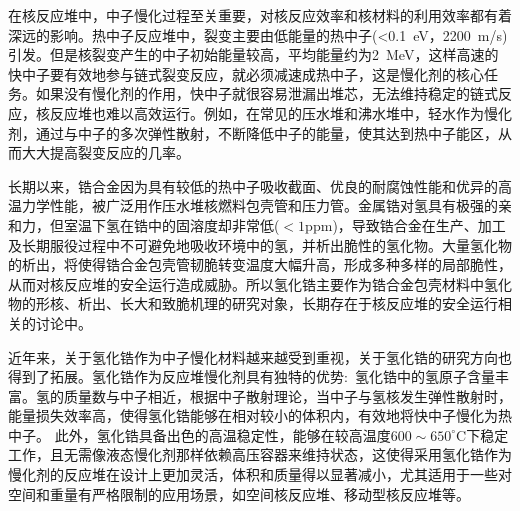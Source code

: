 \maketitle
在核反应堆中，中子慢化过程至关重要，对核反应效率和核材料的利用效率都有着深远的影响。热中子反应堆中，裂变主要由低能量的热中子\textrm{(<0.1~eV，2200~m/s)}引发。但是核裂变产生的中子初始能量较高，平均能量约为\textrm{2~MeV}，这样高速的快中子要有效地参与链式裂变反应，就必须减速成热中子，这是慢化剂的核心任务。如果没有慢化剂的作用，快中子就很容易泄漏出堆芯，无法维持稳定的链式反应，核反应堆也难以高效运行。例如，在常见的压水堆和沸水堆中，轻水作为慢化剂，通过与中子的多次弹性散射，不断降低中子的能量，使其达到热中子能区，从而大大提高裂变反应的几率。

长期以来，锆合金因为具有较低的热中子吸收截面、优良的耐腐蚀性能和优异的高温力学性能，被广泛用作压水堆核燃料包壳管和压力管。金属锆对氢具有极强的亲和力，但室温下氢在锆中的固溶度却非常低\textrm{($<1\mathrm{ppm}$)}，导致锆合金在生产、加工及长期服役过程中不可避免地吸收环境中的氢，并析出脆性的氢化物。大量氢化物的析出，将使得锆合金包壳管韧脆转变温度大幅升高，形成多种多样的局部脆性，从而对核反应堆的安全运行造成威胁。所以氢化锆主要作为锆合金包壳材料中氢化物的形核、析出、长大和致脆机理的研究对象，长期存在于核反应堆的安全运行相关的讨论中。

近年来，关于氢化锆作为中子慢化材料越来越受到重视，关于氢化锆的研究方向也得到了拓展。氢化锆作为反应堆慢化剂具有独特的优势:~氢化锆中的氢原子含量丰富。氢的质量数与中子相近，根据中子散射理论，当中子与氢核发生弹性散射时，能量损失效率高，使得氢化锆能够在相对较小的体积内，有效地将快中子慢化为热中子。%
此外，氢化锆具备出色的高温稳定性，能够在较高温度$600\sim650^{\circ}\mathrm{C}$下稳定工作，且无需像液态慢化剂那样依赖高压容器来维持状态，这使得采用氢化锆作为慢化剂的反应堆在设计上更加灵活，体积和质量得以显著减小，尤其适用于一些对空间和重量有严格限制的应用场景，如空间核反应堆、移动型核反应堆等。

